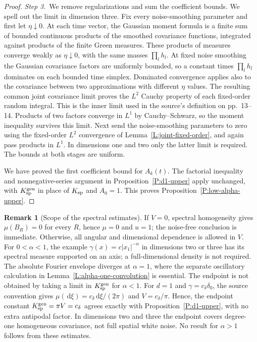 \documentclass[12pt,oneside,openany]{book}
\numberwithin{equation}{section}
\theoremstyle{nogostyle}
\theoremstyle{definition}
\newtheorem{remark}[theorem]{Remark}
\newcommand{\ud}{\,\mathrm{d}}
\begin{document}
\begin{proof}
  \medskip
  \noindent\textit{Step 3.~}We remove regularizations and sum the coefficient
  bounds.
  We spell out the limit in dimension three. Fix every noise-smoothing parameter
  and first let $\eta\downarrow0$. At each time vector, the Gaussian moment
  formula is a finite sum of bounded continuous products of the smoothed
  covariance functions, integrated against products of the finite Green
  measures. These products of measures converge weakly as $\eta\downarrow0$,
  with the same masses $\prod_l h_l$. At fixed noise smoothing the Gaussian
  covariance factors are uniformly bounded, so a constant times $\prod_lh_l$
  dominates on each bounded time simplex. Dominated convergence applies also to
  the covariance between two approximations with different $\eta$ values. The
  resulting common joint covariance limit proves the $L^2$ Cauchy property of
  each fixed-order random integral. This is the inner limit used in the source's
  definition on pp.~13--14. Products of two factors converge in $L^1$ by
  Cauchy--Schwarz, so the moment inequality survives this limit. Next send the
  noise-smoothing parameters to zero using the fixed-order $L^2$ convergence of
  Lemma~\ref{L:joint-fixed-order}, and again pass products in $L^1$. In
  dimensions one and two only the latter limit is required. The bounds at both
  stages are uniform.

  We have proved the first coefficient bound for $A_k(t)$. The factorial
  inequality and nonnegative-series argument in Proposition~\ref{P:d1-upper}
  apply unchanged, with $K_{\rm sp}^{\rm gen}$ in place of $K_{\rm sp}$ and $A_0
  = 1$. This proves Proposition~\ref{P:low-alpha-upper}.
\end{proof}

\begin{remark}[Scope of the spectral estimates]\label{R:low-alpha-scope}
  If $V = 0$, spectral homogeneity gives $\mu(B_R) = 0$ for every $R$, hence
  $\mu = 0$ and $u = 1$; the noise-free conclusion is immediate. Otherwise, all
  angular and dimensional dependence is allowed in $V$. For $0 < \alpha < 1$,
  the example $\gamma(x) = c|x_1|^{-\alpha}$ in dimensions two or three has its
  spectral measure supported on an axis; a full-dimensional density is not
  required. The absolute Fourier envelope diverges at $\alpha = 1$, where the
  separate oscillatory calculation in Lemma~\ref{L:alpha-one-convolution} is
  essential. The endpoint is not obtained by taking a limit in $K_{\rm sp}^{\rm
  gen}$ for $\alpha < 1$. For $d = 1$ and $\gamma = c_\delta\delta_0$, the
  source convention gives $\mu(\ud\xi) = c_\delta\ud\xi/(2\pi)$ and $V =
  c_\delta/\pi$. Hence, the endpoint constant $K_{\rm sp}^{\rm gen} = \pi V =
  c_\delta$ agrees exactly with Proposition~\ref{P:d1-upper}, with no extra
  antipodal factor. In dimensions two and three the endpoint covers degree-one
  homogeneous covariance, not full spatial white noise. No result for $\alpha >
  1$ follows from these estimates.
\end{remark}
\end{document}
